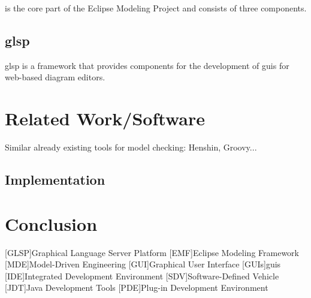 \documentclass[conference,onecolumn]{IEEEtran}
\begin{document}
   is the core part of the Eclipse Modeling Project and consists of three components.

  \subsection{\ac{glsp}}
  \label{subsec:glsp}

  \ac{glsp} is a framework that provides components for the development of \acp{gui} for web-based diagram editors.
  \cite{glsp-repo}

  \section{Related Work/Software}
  \label{sec:related-work}

  Similar already existing tools for model checking: Henshin, Groovy...



  \subsection{Implementation}
  \label{subsec:implementation}


  \section{Conclusion}

  \printbibliography

\begin{acronym}
  [GLSP]{Graphical Language Server Platform}
  [EMF]{Eclipse Modeling Framework}
  [MDE]{Model-Driven Engineering}
  [GUI]{Graphical User Interface}
  [GUIs]{\ac{gui}s}
  [IDE]{Integrated Development Environment}
  [SDV]{Software-Defined Vehicle}
  [JDT]{Java Development Tools}
  [PDE]{Plug-in Development Environment}
\end{acronym}
\end{document}
